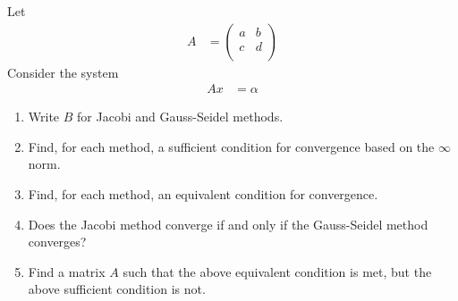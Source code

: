 \documentclass[fleqn, a4paper, 12pt, twoside]{article}
\theoremstyle{definition}
\theoremstyle{theorem}
\begin{document}
\begin{question}
	Let
	\begin{align*}
		A &=
			\begin{pmatrix}
				a & b \\
				c & d \\
			\end{pmatrix}
	\end{align*}
	Consider the system
	\begin{align*}
		A x & = \alpha
	\end{align*}
	\begin{enumerate}
		\item Write $B$ for Jacobi and Gauss-Seidel methods.
		\item Find, for each method, a sufficient condition for convergence based on the $\infty$ norm.
		\item Find, for each method, an equivalent condition for convergence.
		\item Does the Jacobi method converge if and only if the Gauss-Seidel method converges?
		\item Find a matrix $A$ such that the above equivalent condition is met, but the above sufficient condition is not.
	\end{enumerate}
\end{question}
\end{document}

